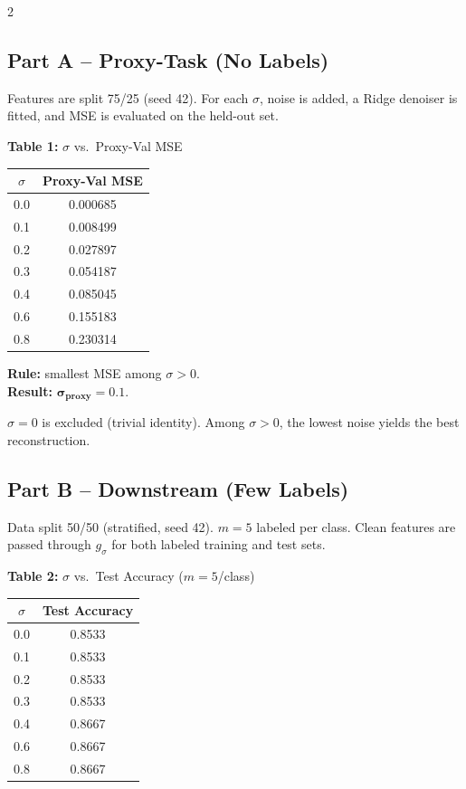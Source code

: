 \documentclass[10pt, letterpaper]{article}
\begin{document}
\begin{multicols}{2}

\subsection{Part A -- Proxy-Task (No Labels)}

Features are split 75/25 (seed 42). For each $\sigma$, noise is added, a Ridge denoiser is fitted, and MSE is evaluated on the held-out set.

\begin{center}
\small
\textbf{Table 1:} $\sigma$ vs.\ Proxy-Val MSE\\[3pt]
\begin{tabular}{cc}
\toprule
$\sigma$ & Proxy-Val MSE \\
\midrule
0.0 & 0.000685 \\
0.1 & 0.008499 \\
0.2 & 0.027897 \\
0.3 & 0.054187 \\
0.4 & 0.085045 \\
0.6 & 0.155183 \\
0.8 & 0.230314 \\
\bottomrule
\end{tabular}
\end{center}

\textbf{Rule:} smallest MSE among $\sigma > 0$.\\
\textbf{Result:} $\boldsymbol{\sigma_{\text{proxy}} = 0.1}$.

$\sigma{=}0$ is excluded (trivial identity). Among $\sigma > 0$, the lowest noise yields the best reconstruction.

\columnbreak

\subsection{Part B -- Downstream (Few Labels)}

Data split 50/50 (stratified, seed 42). $m{=}5$ labeled per class. Clean features are passed through $g_\sigma$ for both labeled training and test sets.

\begin{center}
\small
\textbf{Table 2:} $\sigma$ vs.\ Test Accuracy ($m{=}5$/class)\\[3pt]
\begin{tabular}{cc}
\toprule
$\sigma$ & Test Accuracy \\
\midrule
0.0 & 0.8533 \\
0.1 & 0.8533 \\
0.2 & 0.8533 \\
0.3 & 0.8533 \\
0.4 & 0.8667 \\
0.6 & 0.8667 \\
0.8 & 0.8667 \\
\bottomrule
\end{tabular}
\end{center}


\end{multicols}
\end{document}
